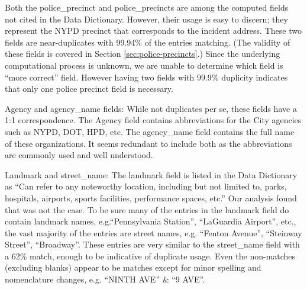 \documentclass[12pt, titlepage]{article}
\begin{document}
 \label{sec:police} 
Both the police\_precinct and police\_precincts are among the computed 
fields not cited in the Data Dictionary. However, their usage is easy to 
discern; they represent the NYPD precinct that corresponds to the
incident address. These two fields are near-duplicates with 99.94\% of the entries 
matching. (The validity of these fields is 
covered in Section \ref{sec:police-precincts}.) Since the underlying 
computational process is unknown, we are unable to determine which 
field is ``more correct'' field. However having two fields with 99.9\% 
duplicity indicates that only one police precinct field is necessary.


 \label{sec:agencyname}
 Agency and agency\_name fields: While not duplicates per se, these fields 
 have a 1:1 correspondence.  The Agency field contains abbreviations 
 for the City agencies such as NYPD, DOT, HPD, etc. The agency\_name 
 field contains the full name of these organizations. It seems 
 redundant to include both as the abbreviations are commonly used
 and well understood.


\label{sec:landmark}
Landmark and street\_name: The landmark field is listed in the Data Dictionary as ``Can refer to 
any noteworthy location, including but not limited to, parks, 
hospitals, airports, sports facilities, performance spaces, etc.'' Our analysis
found that was not the case. To be sure many of the entries in 
the landmark field do contain landmark names, e.g.``Pennsylvania 
Station'', ``LaGuardia Airport'', etc., the vast majority 
of the entries are street names, e.g. ``Fenton Avenue'', ``Steinway 
Street'', ``Broadway''. These entries are very similar to the 
street\_name field with a 62\% match, enough to be indicative 
of duplicate usage. Even the non-matches (excluding blanks) 
appear to be matches except for minor spelling and 
nomenclature changes, e.g. ``NINTH AVE'' \& ``9 AVE''.
\end{document}
